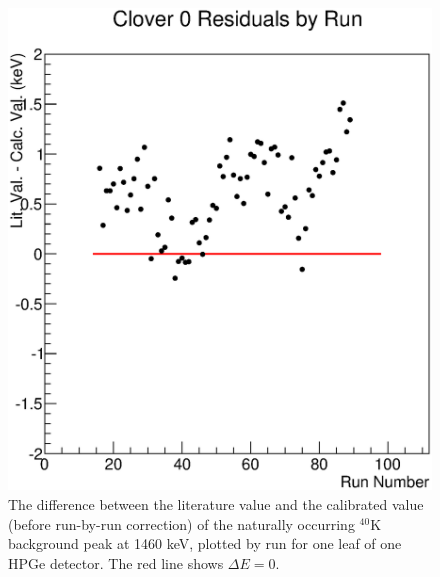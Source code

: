 \begin{figure}
    \centering
    \includegraphics[scale=0.6]{Analysis_Figs/residual_by_run.eps}
    \caption[Example of calibration drift by run.]{The difference between the literature value and the calibrated value (before run-by-run correction) of the naturally occurring $^{40}$K background peak at 1460 keV, plotted by run for one leaf of one HPGe detector. The red line shows $\Delta E=0$.}
    \label{fig:clover_run}
\end{figure}